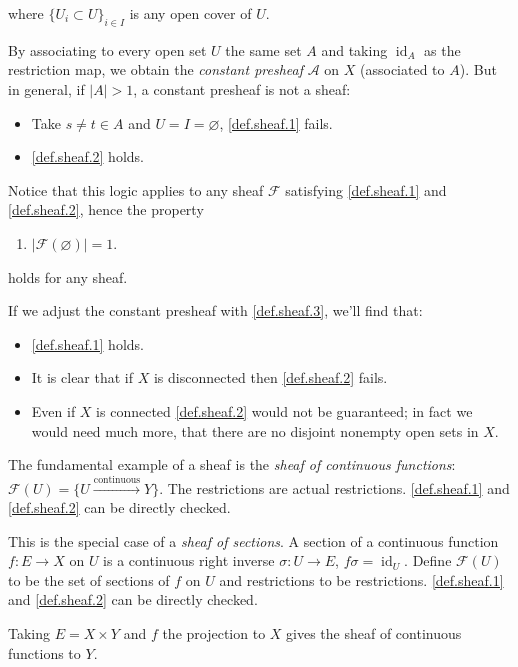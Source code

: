 \noindent where $\{U_i\subset U\}_{i\in I}$ is any open cover of $U$. 

\begin{example}
    By associating to every open set $U$ the same set $A$ and taking $\operatorname{id}_A$ as the restriction map, we obtain the \emph{constant presheaf} $\mathcal{A}$ on $X$ (associated to $A$).
    But in general, if $|A|>1$, a constant presheaf is not a sheaf:
    \begin{itemize}
        \item Take $s\neq t\in A$ and $U=I=\varnothing$, 
        \ref{def.sheaf.1} fails.
        \item \ref{def.sheaf.2} holds.
    \end{itemize}
\end{example}

\begin{remark}
    Notice that this logic applies to any sheaf $\mathcal{F}$ satisfying \ref{def.sheaf.1} and \ref{def.sheaf.2}, hence the property
    \begin{enumerate}[resume*=sheaf]
        \item\label{def.sheaf.3} $|\mathcal{F}(\varnothing)|=1$.
    \end{enumerate}
    holds for any sheaf.
\end{remark}


If we adjust the constant presheaf with \ref{def.sheaf.3}, we'll find that: 
\begin{itemize}
    \item \ref{def.sheaf.1} holds.
    \item It is clear that if $X$ is disconnected then \ref{def.sheaf.2} fails.
    \item Even if $X$ is connected \ref{def.sheaf.2} would not be guaranteed; in fact we would need much more, that there are no disjoint nonempty open sets in $X$.
\end{itemize}

\begin{example}
    The fundamental example of a sheaf is the \emph{sheaf of continuous functions}: $\mathcal{F}(U)=\{U\xrightarrow{\text{continuous}}Y\}$. The restrictions are actual restrictions. \ref{def.sheaf.1} and \ref{def.sheaf.2} can be directly checked.
    
    This is the special case of a \emph{sheaf of sections}. A section of a continuous function $f:E\to X$ on $U$ is a continuous right inverse $\sigma:U\to E$, $f\sigma=\operatorname{id}_U$. Define $\mathcal{F}(U)$ to be the set of sections of $f$ on $U$ and restrictions to be restrictions. \ref{def.sheaf.1} and \ref{def.sheaf.2} can be directly checked.

    Taking $E=X\times Y$ and $f$ the projection to $X$ gives the sheaf of continuous functions to $Y$.
\end{example}

